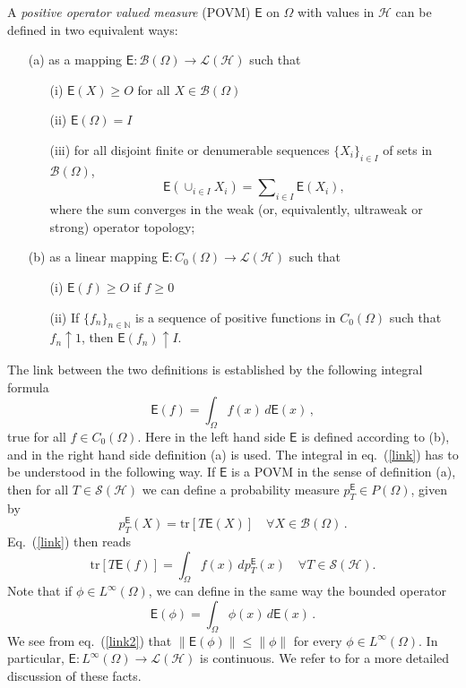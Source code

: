 \documentclass[12pt]{amsart}
\theoremstyle{definition}
\newcommand{\N}{\mathbb N} %
\newcommand{\hi}{\mathcal{H}} %
\newcommand{\lh}{\mathcal{L(H)}} %
\newcommand{\sh}{\mathcal{S(H)}} %
\newcommand{\no}[1]{\left\|#1\right\|} %
\newcommand{\tr}[1]{\mathrm{tr}\left[#1\right]} %
\newcommand{\nil}{O} %
\newcommand{\Eo}{\mathsf{E}} %
\newcommand{\bor}[1]{\mathcal{B}(#1)} %
\newcommand{\linf}[1]{L^\infty \left( #1 \right)}
\newcommand{\de}{\, d}
\newcommand{\frecc}{\rightarrow}
\begin{document}
A {\em positive operator valued measure} (POVM) $\Eo$ on $\Omega$ with values
in $\hi$ can be defined in two equivalent ways:
\begin{itemize}
\item[\rm (a)] as a mapping $\Eo : \bor{\Omega} \frecc \lh$ such that
\begin{itemize}
\item[\rm (i)] $\Eo(X) \geq \nil$ for all $X\in\bor{\Omega}$
\item[\rm (ii)] $\Eo(\Omega) = I$
\item[\rm (iii)] for all disjoint finite or denumerable sequences $\{ X_i \}_{i\in I}$ of
sets in $\bor{\Omega}$,
\begin{equation*}
\Eo \left( \cup_{i\in I} X_i \right) = \sum\nolimits_{i\in I} \Eo(X_i) ,
\end{equation*}
where the sum converges in the weak (or, equivalently, ultraweak or strong) operator topology;
\end{itemize}
\item[\rm (b)] as a linear mapping $\Eo : C_0 (\Omega) \frecc \lh$ such that
\begin{itemize}
\item[\rm (i)] $\Eo (f) \geq \nil$ if $f\geq 0$
\item[\rm (ii)] If $\{ f_n \}_{n\in \N}$ is a sequence of positive functions in
$C_0 (\Omega)$ such that $f_n \uparrow 1$, then $\Eo (f_n) \uparrow I$.
\end{itemize}
\end{itemize}

The link between the two definitions is established by the following integral formula
\begin{equation}\label{link}
\Eo (f) = \int_\Omega f( x) \de \Eo ( x) \, ,
\end{equation}
true for all $f\in C_0 (\Omega)$. Here in the left hand side $\Eo$ is defined according to {\rm (b)}, and in the right
hand side definition  {\rm (a)} is used. The integral in eq.~(\ref{link}) has to be understood in the following way. If $\Eo$ is a POVM in the sense of definition {\rm (a)}, then for all
$T\in\sh$ we can define a probability measure $p^{\Eo}_T \in P(\Omega)$, given by
\begin{equation}\label{eq:prob}
p^{\Eo}_T (X) = \tr{T\Eo (X)} \quad \forall X\in\bor{\Omega} \, .
\end{equation}
Eq.~(\ref{link}) then reads
\begin{equation*}
\tr{T \Eo (f)} = \int_\Omega f( x) \de p^{\Eo}_T ( x) \quad \forall T\in\sh .
\end{equation*}
Note that if $\phi\in\linf{\Omega}$, we can define in the same way the bounded operator
\begin{equation}\label{link2}
\Eo (\phi) = \int_\Omega \phi ( x) \de \Eo ( x) \, .
\end{equation}
We see from eq.~(\ref{link2}) that $\no{\Eo(\phi)} \leq \no{\phi}$ for every $\phi \in \linf{\Omega}$. In particular, $\Eo : \linf{\Omega} \frecc \lh$ is continuous. We refer to \cite{NST66} for a more detailed discussion of these facts.
\end{document}
